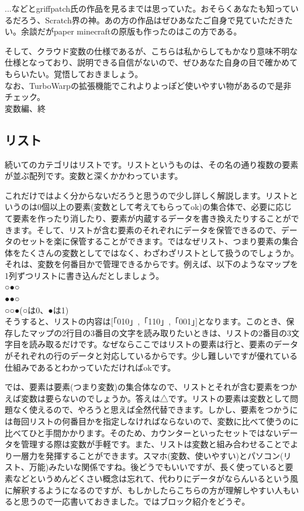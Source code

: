 \documentclass[b5paper,10pt]{jsarticle}
\begin{document}
\begin{multicols*}{3}
...などとgriffpatch氏の作品を見るまでは思っていた。おそらくあなたも知っているだろう、Scratch界の神。あの方の作品はぜひあなたご自身で見ていただきたい。余談だがpaper minecraftの原版も作ったのはこの方である。

そして、クラウド変数の仕様であるが、こちらは私からしてもかなり意味不明な仕様となっており、説明できる自信がないので、ぜひあなた自身の目で確かめてもらいたい。覚悟しておきましょう。\\
なお、TurboWarpの拡張機能でこれよりよっぽど使いやすい物があるので是非チェック。\\
変数編、終

\subsection{リスト}
続いてのカテゴリはリストです。リストというものは、その名の通り複数の要素が並ぶ配列です。変数と深くかかわっています。

これだけではよく分からないだろうと思うので少し詳しく解説します。リストというのは0個以上の要素(変数として考えてもらってok)の集合体で、必要に応じて要素を作ったり消したり、要素が内蔵するデータを書き換えたりすることができます。そして、リストが含む要素のそれぞれにデータを保管できるので、データのセットを楽に保管することができます。ではなぜリスト、つまり要素の集合体をたくさんの変数としてではなく、わざわざリストとして扱うのでしょうか。それは、変数を何番目かで管理できるからです。例えば、以下のようなマップを1列ずつリストに書き込んだとしましょう。\\
○●○\\
●●○\\
○○●(○は0、●は1)\\
そうすると、リストの内容は[「010」,「110」,「001」]となります。このとき、保存したマップの2行目の3番目の文字を読み取りたいときは、リストの2番目の3文字目を読み取るだけです。なぜならここではリストの要素は行と、要素のデータがそれぞれの行のデータと対応しているからです。少し難しいですが優れている仕組みであるとわかっていただければokです。

では、要素は要素(つまり変数)の集合体なので、リストとそれが含む要素をつかえば変数は要らないのでしょうか。答えは△です。リストの要素は変数として問題なく使えるので、やろうと思えば全然代替できます。しかし、要素をつかうには毎回リストの何番目かを指定しなければならないので、変数に比べて使うのに比べてひと手間かかります。そのため、カウンターといったセットではないデータを管理する際は変数が手軽です。また、リストは変数と組み合わせることでより一層力を発揮することができます。スマホ(変数、使いやすい)とパソコン(リスト、万能)みたいな関係ですね。後どうでもいいですが、長く使っていると要素などというめんどくさい概念は忘れて、代わりにデータがならんいるという風に解釈するようになるのですが、もしかしたらこちらの方が理解しやすい人もいると思うので一応書いておきました。ではブロック紹介をどうぞ。


\end{multicols*}
\end{document}
